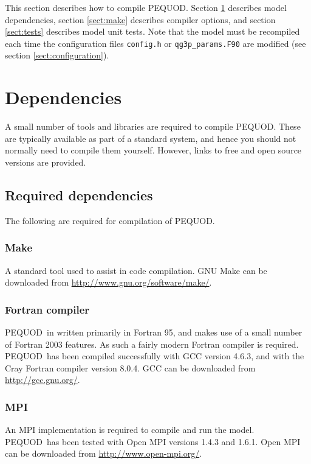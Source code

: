\documentclass[a4paper]{book}
\newcommand{\pequod}{PEQUOD}
\begin{document}
This section describes how to compile \pequod. Section \ref{sect:dependencies}
describes model dependencies, section \ref{sect:make} describes compiler
options, and section \ref{sect:tests} describes model unit tests. Note that the
model must be recompiled each time the configuration files \verb+config.h+ or
\verb+qg3p_params.F90+ are modified (see section \ref{sect:configuration}).

\section{Dependencies}\label{sect:dependencies}

A small number of tools and libraries are required to compile \pequod. These are
typically available as part of a standard system, and hence you should not
normally need to compile them yourself. However, links to free and open source
versions are provided.

\subsection{Required dependencies}

The following are required for compilation of \pequod.

\subsubsection*{Make}

A standard tool used to assist in code compilation. GNU Make can be downloaded
from \url{http://www.gnu.org/software/make/}.

\subsubsection*{Fortran compiler}

\pequod\ in written primarily in Fortran 95, and makes use of a small number of
Fortran 2003 features. As such a fairly modern Fortran compiler is required.
\pequod\ has been compiled successfully with GCC version 4.6.3, and
with the Cray Fortran compiler version 8.0.4. GCC can be downloaded from
\url{http://gcc.gnu.org/}.

\subsubsection*{MPI}

An MPI implementation is required to compile and run the model. \pequod\
has been tested with Open MPI versions 1.4.3 and 1.6.1. Open MPI can be downloaded
from \url{http://www.open-mpi.org/}.
\end{document}
